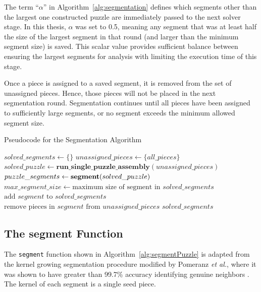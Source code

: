 The term ``\textit{$\alpha$}'' in Algorithm~\ref{alg:segmentation} defines which segments other than the largest one constructed puzzle are immediately passed to the next solver stage.  In this thesis, \textit{$\alpha$} was set to 0.5, meaning any segment that was at least half the size of the largest segment in that round (and larger than the minimum segment size) is saved.  This scalar value provides sufficient balance between ensuring the largest segments for analysis with limiting the execution time of this stage.

Once a piece is assigned to a saved segment, it is removed from the set of unassigned pieces.  Hence, those pieces will not be placed in the next segmentation round.  Segmentation continues until all pieces have been assigned to sufficiently large segments, or no segment exceeds the minimum allowed segment size.

\begin{algorithm}
\caption{Pseudocode for the Segmentation Algorithm}\label{alg:segmentation}
\begin{algorithmic}[1]
    \State $\textit{solved\_segments} \gets \{ \}$
    \State $unassigned\_pieces \gets \{ \textit{all\_pieces} \}$
    \Repeat
        \State $solved\_puzzle \gets \textbf{run\_single\_puzzle\_assembly}(unassigned\_pieces)$
        \State $puzzle\_segments \gets \textbf{segment}(solved\_puzzle\text)$
        \State $max\_segment\_size \gets \text{maximum size of segment in } solved\_segments$
                \State $\text{add } segment \text{ to } solved\_segments$
                \State $\text{remove pieces in } segment \text{ from } unassigned\_pieces$
            \EndIf
        \EndFor
    \State \Return $solved\_segments$
\EndFunction
\end{algorithmic}
\end{algorithm}

\subsection{The segment Function}\label{sec:segmentPuzzle}

The \texttt{segment} function shown in Algorithm~\ref{alg:segmentPuzzle} is adapted from the kernel growing segmentation procedure modified by Pomeranz \textit{et al.}, where it was shown to have greater than 99.7\% accuracy identifying genuine neighbors \cite{pomeranz2011}. The kernel of each segment is a single seed piece.


